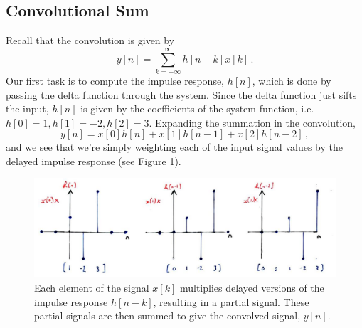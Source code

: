 \subsection{Convolutional Sum}
%
Recall that the convolution is given by
%
\begin{displaymath}
  y[n] = \sum_{k=-\infty}^\infty h[n-k] x[k] \,.
\end{displaymath}
%
Our first task is to compute the impulse response, $h[n]$, which is done by passing
the delta function through the system. Since the delta function just sifts the input,
$h[n]$ is given by the coefficients of the system function, i.e.
$h[0] = 1, h[1] = -2, h[2] = 3$. Expanding the summation in the convolution,
%
\begin{displaymath}
  y[n] = x[0]h[n] + x[1]h[n-1] + x[2]h[n-2] \,,
\end{displaymath}
%
and we see that we're simply weighting each of the input signal values by the
delayed impulse response (see Figure \ref{fig::lecture_3_impulse_response_weighting}).
%
\begin{figure}[H]
  \includegraphics[width=\textwidth]{images/lecture_3_impulse_response_weighting.JPG}
  \caption{
    Each element of the signal $x[k]$ multiplies delayed versions of the impulse
    response $h[n-k]$, resulting in a partial signal. These partial signals are
    then summed to give the convolved signal, $y[n]$.
  }
  \label{fig::lecture_3_impulse_response_weighting}
\end{figure}

